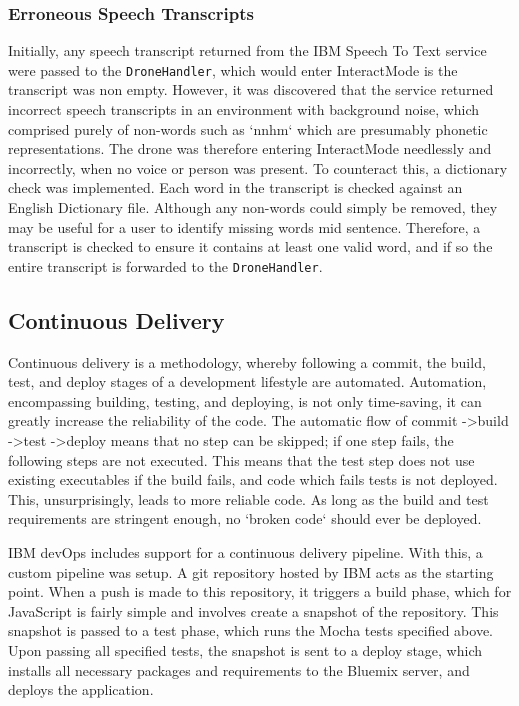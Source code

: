 \documentclass{article}
\begin{document}
\subsubsection{Erroneous Speech Transcripts}
Initially, any speech transcript returned from the IBM Speech To Text service were passed to the \texttt{DroneHandler}, which would enter InteractMode is the transcript was non empty. However, it was discovered that the service returned incorrect speech transcripts in an environment with background noise, which comprised purely of non-words such as `nnhm` which are presumably phonetic representations. The drone was therefore entering InteractMode needlessly and incorrectly, when no voice or person was present. To counteract this, a dictionary check was implemented. Each word in the transcript is checked against an English Dictionary file. Although any non-words could simply be removed, they may be useful for a user to identify missing words mid sentence. Therefore, a transcript is checked to ensure it contains at least one valid word, and if so the entire transcript is forwarded to the \texttt{DroneHandler}. 

\subsection{Continuous Delivery} \label{ContinuousDelivery}
Continuous delivery is a methodology, whereby following a commit, the build, test, and deploy stages of a development lifestyle are automated. Automation, encompassing building, testing, and deploying, is not only time-saving, it can greatly increase the reliability of the code. The automatic flow of commit -\textgreater build -\textgreater test -\textgreater deploy means that no step can be skipped; if one step fails, the following steps are not executed. This means that the test step does not use existing executables if the build fails, and code which fails tests is not deployed. This, unsurprisingly, leads to more reliable code. As long as the build and test requirements are stringent enough, no `broken code` should ever be deployed\cite{co475}.

IBM devOps includes support for a continuous delivery pipeline. With this, a custom pipeline was setup. A git repository hosted by IBM acts as the starting point. When a push is made to this repository, it triggers a build phase, which for JavaScript is fairly simple and involves create a snapshot of the repository. This snapshot is passed to a test phase, which runs the Mocha tests specified above. Upon passing all specified tests, the snapshot is sent to a deploy stage, which installs all necessary packages and requirements to the Bluemix server, and deploys the application. 
\end{document}

